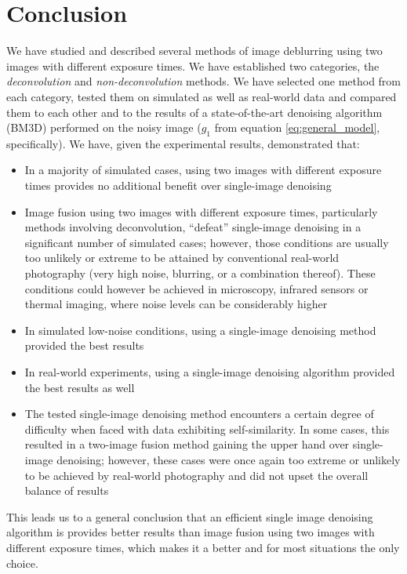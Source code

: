 \documentclass[12pt,notitlepage]{report}
\begin{document}
\clearpage

\chapter{Conclusion}

We have studied and described several methods of image deblurring using two images with different exposure times. We have established two categories, the {\em deconvolution} and {\em non-deconvolution} methods.  We have selected one method from each category, tested them on simulated as well as real-world data and compared them to each other and to the results of a state-of-the-art denoising algorithm (BM3D) performed on the noisy image ($g_1$ from equation \ref{eq:general_model}, specifically). We have, given the experimental results, demonstrated that: 

\begin{itemize}
\item In a majority of simulated cases, using two images with different exposure times provides no additional benefit over single-image denoising
\item Image fusion using two images with different exposure times, particularly methods involving deconvolution, “defeat” single-image denoising in a significant number of simulated cases; however, those conditions are usually too unlikely or extreme to be attained by conventional real-world photography (very high noise, blurring, or a combination thereof). These conditions could however be achieved in microscopy, infrared sensors or thermal imaging, where noise levels can be considerably higher
\item In simulated low-noise conditions, using a single-image denoising method provided the best results
\item In real-world experiments, using a single-image denoising algorithm provided the best results as well
\item The tested single-image denoising method encounters a certain degree of difficulty when faced with data exhibiting self-similarity. In some cases, this resulted in a two-image fusion method gaining the upper hand over single-image denoising; however, these cases were once again too extreme or unlikely to be achieved by real-world photography and did not upset the overall balance of results
\end{itemize}

This leads us to a general conclusion that an efficient single image denoising algorithm is provides better results than image fusion using two images with different exposure times, which makes it a better and for most situations the only choice. 
\end{document}
